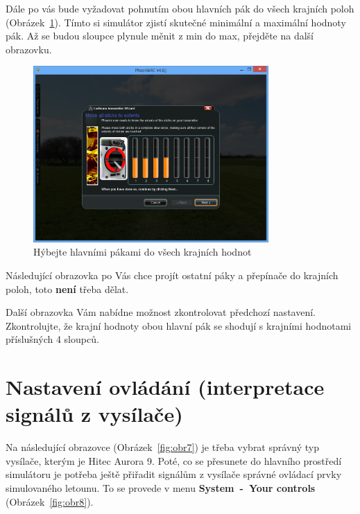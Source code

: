\documentclass[11pt, a4paper]{article}
\begin{document}
Dále po vás bude vyžadovat pohnutím obou hlavních pák do všech krajních poloh (Obrázek~\ref{fig:obr6}). Tímto si simulátor zjistí skutečné minimální a maximální hodnoty pák. Až se budou sloupce plynule měnit z min do max, přejděte na další obrazovku.

\begin{figure}[h]
\begin{center}
\includegraphics[width=0.8\textwidth]{fig/4.PNG}
\caption{Hýbejte hlavními pákami do všech krajních hodnot}
\label{fig:obr6}
\end{center}
\end{figure}

Následující obrazovka po Vás chce projít ostatní páky a přepínače do krajních poloh, toto \textbf{není} třeba dělat.

Další obrazovka Vám nabídne možnost zkontrolovat předchozí nastavení. Zkontrolujte, že krajní hodnoty obou hlavní pák se shodují s krajními hodnotami příslušných 4 sloupců.

\section{Nastavení ovládání (interpretace signálů z vysílače)}

Na následující obrazovce (Obrázek~\ref{fig:obr7}) je třeba vybrat správný typ vysílače, kterým je Hitec Aurora 9. Poté, co se přesunete do hlavního prostředí simulátoru je potřeba ještě přiřadit signálům z vysílače správné ovládací prvky simulovaného letounu. To se provede v menu \textbf{System~-~Your controls} (Obrázek~\ref{fig:obr8}).
\end{document}
